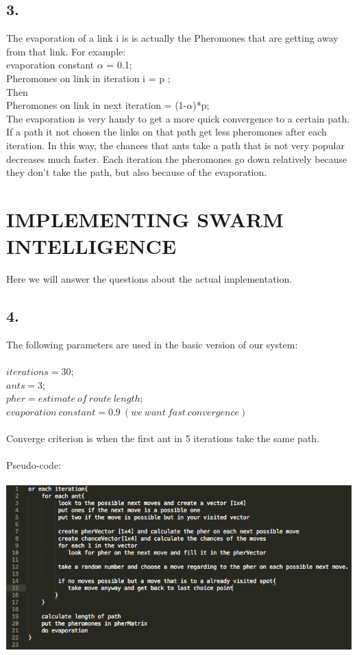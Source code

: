 \documentclass{scrartcl}
\begin{document}
\subsection*{3.}
 The evaporation of a link i is is actually the Pheromones that are getting away from that link. For example:\\
 evaporation constant $\alpha$ = 0.1;\\
 Pheromones on link in iteration i = p ;\\
 Then \\
 Pheromones on link in next iteration = (1-$\alpha$)*p;\\
 The evaporation is very handy to get a more quick convergence to a certain path. If a path it not chosen the links on that path get less pheromones after each iteration. In this way, the chances that ants take a path that is not very popular decreases much faster. Each iteration the pheromones go down relatively because they don't take the path, but also because of the evaporation.
 \pagebreak
 \section*{IMPLEMENTING SWARM INTELLIGENCE}
 Here we will answer the questions about the actual implementation.
 
 \subsection*{4.}
 The following parameters are used in the basic version of our system:\\\\
 $ iterations = 30; $\\
 $ ants = 3; $ \\
 $ pher = estimate\:of\:route\:length; $\\
 $ evaporation\:constant = 0.9\:(we\:want\:fast\:convergence) $\\ \\
Converge criterion is when the first ant in 5 iterations take the same path.\\\\
Pseudo-code:\\\\
\includegraphics[width=1\textwidth]{pseudo.png}
\end{document}
